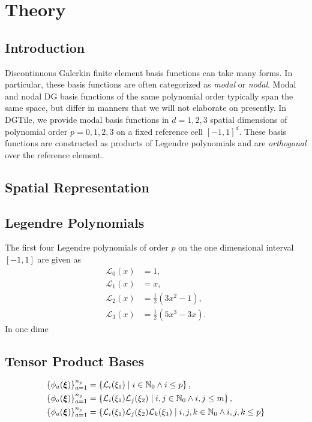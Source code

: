 \section{Theory}

\subsection{Introduction}

Discontinuous Galerkin finite element basis functions can take many forms.
In particular, these basis functions are often categorized as \emph{modal}
or \emph{nodal}. Modal and nodal DG basis functions of the same polynomial
order typically span the same space, but differ in manners that we will not
elaborate on presently. In DGTile, we provide modal basis functions in
$d=1,2,3$ spatial dimensions of polynomial order $p=0,1,2,3$ on a fixed
reference cell $[-1,1]^d$. These basis functions are constructed as products
of Legendre polynomials and are \emph{orthogonal} over the reference element.

\subsection{Spatial Representation}

\subsection{Legendre Polynomials}

The first four Legendre polynomials of order $p$ on the one dimensional
interval $[-1,1]$ are given as
%
\begin{equation}
\begin{aligned}
\mathcal{L}_0(x) &= 1, \\
\mathcal{L}_1(x) &= x, \\
\mathcal{L}_2(x) &= \frac12 (3x^2-1), \\
\mathcal{L}_3(x) &= \frac12 (5x^3-3x).
\end{aligned}
\label{eq:legendre_polynomials}
\end{equation}
%
In one dime

\subsection{Tensor Product Bases}

\begin{equation}
\begin{aligned}
\left\{ \phi_a(\boldsymbol{\xi}) \right\}_{a=1}^{n_p} &=
  \left\{ \mathcal{L}_i(\xi_1) \; | \; i \in \mathbb{N}_0 \land i \leq p
  \right\}, \\
\left\{ \phi_a(\boldsymbol{\xi}) \right\}_{a=1}^{n_p} &=
  \left\{ \mathcal{L}_i(\xi_1) \mathcal{L}_j(\xi_2) \; | \; i,j \in
  \mathbb{N}_0 \land i,j \leq m \right\}, \\
\left\{ \phi_a(\boldsymbol{\xi}) \right\}_{a=1}^{n_p} &=
  \left\{ \mathcal{L}_i(\xi_1) \mathcal{L}_j(\xi_2) \mathcal{L}_k(\xi_3) \; |
  \; i,j,k \in \mathbb{N}_0 \land i,j,k \leq p \right\}
\end{aligned}
\label{eq:tensor_basis}
\end{equation}

